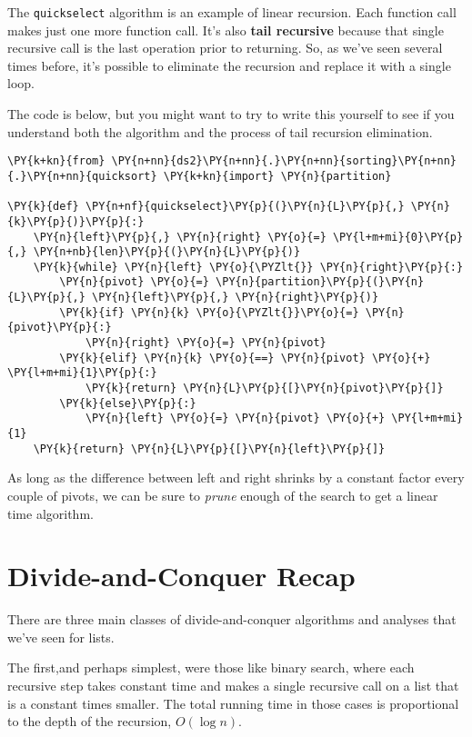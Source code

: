 The \texttt{quickselect} algorithm is an example of linear recursion.  Each function call makes just one more function call.  It's also \textbf{tail recursive} because that single recursive call is the last operation prior to returning.  So, as we've seen several times before, it's possible to eliminate the recursion and replace it with a single loop.  


The code is below, but you might want to try to write this yourself to see if you understand both the algorithm and the process of tail recursion elimination.

\begin{Verbatim}[commandchars=\\\{\}]
\PY{k+kn}{from} \PY{n+nn}{ds2}\PY{n+nn}{.}\PY{n+nn}{sorting}\PY{n+nn}{.}\PY{n+nn}{quicksort} \PY{k+kn}{import} \PY{n}{partition}

\PY{k}{def} \PY{n+nf}{quickselect}\PY{p}{(}\PY{n}{L}\PY{p}{,} \PY{n}{k}\PY{p}{)}\PY{p}{:}
    \PY{n}{left}\PY{p}{,} \PY{n}{right} \PY{o}{=} \PY{l+m+mi}{0}\PY{p}{,} \PY{n+nb}{len}\PY{p}{(}\PY{n}{L}\PY{p}{)}
    \PY{k}{while} \PY{n}{left} \PY{o}{\PYZlt{}} \PY{n}{right}\PY{p}{:}
        \PY{n}{pivot} \PY{o}{=} \PY{n}{partition}\PY{p}{(}\PY{n}{L}\PY{p}{,} \PY{n}{left}\PY{p}{,} \PY{n}{right}\PY{p}{)}
        \PY{k}{if} \PY{n}{k} \PY{o}{\PYZlt{}}\PY{o}{=} \PY{n}{pivot}\PY{p}{:}
            \PY{n}{right} \PY{o}{=} \PY{n}{pivot}
        \PY{k}{elif} \PY{n}{k} \PY{o}{==} \PY{n}{pivot} \PY{o}{+} \PY{l+m+mi}{1}\PY{p}{:}
            \PY{k}{return} \PY{n}{L}\PY{p}{[}\PY{n}{pivot}\PY{p}{]}
        \PY{k}{else}\PY{p}{:}
            \PY{n}{left} \PY{o}{=} \PY{n}{pivot} \PY{o}{+} \PY{l+m+mi}{1}
    \PY{k}{return} \PY{n}{L}\PY{p}{[}\PY{n}{left}\PY{p}{]}
\end{Verbatim}



As long as the difference between left and right shrinks by a constant factor every couple of pivots, we can be sure to \emph{prune} enough of the search to get a linear time algorithm.

\section{Divide-and-Conquer Recap}


There are three main classes of divide-and-conquer algorithms and analyses that we've seen for lists.  


The first,and perhaps simplest, were those like binary search, where each recursive step takes constant time and makes a single recursive call on a list that is a constant times smaller.  The total running time in those cases is proportional to the depth of the recursion, $O(\log n)$.


